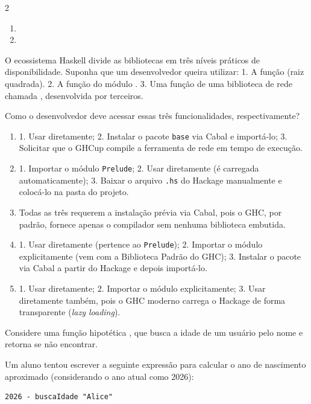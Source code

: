 \documentclass[a4paper,10pt,brazil]{article}
\begin{document}
\begin{multicols}{2}
\begin{enumerate}
  \item {}

  \item {}


\end{enumerate}

O ecossistema Haskell divide as bibliotecas em três níveis práticos de disponibilidade. Suponha que um desenvolvedor queira utilizar:
1. A função  (raiz quadrada).
2. A função  do módulo .
3. Uma função de uma biblioteca de rede chamada , desenvolvida por terceiros.

Como o desenvolvedor deve acessar essas três funcionalidades, respectivamente?

\begin{enumerate}
  \item 1. Usar diretamente; 2. Instalar o pacote \texttt{base} via Cabal e importá-lo; 3. Solicitar que o GHCup compile a ferramenta de rede em tempo de execução.

  \item 1. Importar o módulo \texttt{Prelude}; 2. Usar diretamente (é carregada automaticamente); 3. Baixar o arquivo \texttt{.hs} do Hackage manualmente e colocá-lo na pasta do projeto.

  \item Todas as três requerem a instalação prévia via Cabal, pois o GHC, por padrão, fornece apenas o compilador sem nenhuma biblioteca embutida.

  \item 1. Usar diretamente (pertence ao \texttt{Prelude}); 2. Importar o módulo explicitamente (vem com a Biblioteca Padrão do GHC); 3. Instalar o pacote via Cabal a partir do Hackage e depois importá-lo.

  \item 1. Usar diretamente; 2. Importar o módulo explicitamente; 3. Usar diretamente também, pois o GHC moderno carrega o Hackage de forma transparente (\emph{lazy loading}).


\end{enumerate}

Considere uma função hipotética , que busca a idade de um usuário pelo nome e retorna  se não encontrar. 

Um aluno tentou escrever a seguinte expressão para calcular o ano de nascimento aproximado (considerando o ano atual como 2026):
\begin{verbatim}
2026 - buscaIdade "Alice"
\end{verbatim}


\end{multicols}
\end{document}

